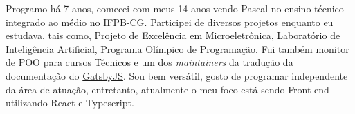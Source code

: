 \begin{cvletter}
  Programo há 7 anos, comecei com meus 14 anos vendo Pascal no ensino técnico integrado ao médio no IFPB-CG. Participei de diversos projetos enquanto eu estudava, tais como, Projeto de Excelência em Microeletrônica, Laboratório de Inteligência Artificial, Programa Olímpico de Programação. Fui também monitor de POO para cursos Técnicos e um dos \textit{maintainers} da tradução da documentação do \href{https://www.gatsbyjs.org/}{GatsbyJS}. Sou bem versátil, gosto de programar independente da área de atuação, entretanto, atualmente o meu foco está sendo Front-end utilizando React e Typescript.

\end{cvletter}